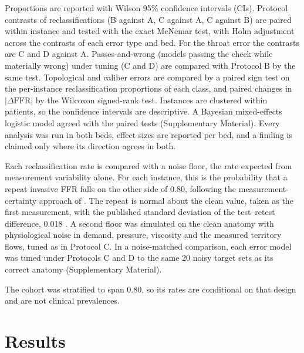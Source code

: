 \documentclass[journal,twoside,web]{ieeecolor}
\begin{document}
Proportions are reported with Wilson 95\% confidence intervals (CIs). Protocol contrasts of reclassifications (B against A, C against A, C against B) are paired within instance and tested with the exact McNemar test, with Holm adjustment across the contrasts of each error type and bed. For the throat error the contrasts are C and D against A. Passes-and-wrong (models passing the check while materially wrong) under tuning (C and D) are compared with Protocol B by the same test. Topological and caliber errors are compared by a paired sign test on
the per-instance reclassification proportions of each class, and paired changes in $|\Delta\mathrm{FFR}|$ by the Wilcoxon
signed-rank test. Instances are clustered within patients, so the confidence intervals are descriptive. A Bayesian mixed-effects logistic model agreed with the paired tests (Supplementary Material). Every analysis was run in both beds, effect sizes are reported per bed, and a finding is
claimed only where its direction agrees in both.

Each reclassification rate is compared with a noise floor, the rate expected from measurement variability alone. For each instance, this is the probability that a repeat invasive FFR falls on the other side of 0.80, following the measurement-certainty approach of \cite{petraco2013}. The repeat is normal about the clean value, taken as the first measurement, with the published standard deviation of the test--retest difference, 0.018 \cite{johnson2015}. A second floor was simulated on the clean anatomy with physiological
noise in demand, pressure, viscosity and the measured territory flows, tuned as in Protocol C. In a noise-matched comparison, each error model was tuned under Protocols C and D to the same 20 noisy target sets as its correct anatomy (Supplementary Material).

The cohort was stratified to span 0.80, so its rates are conditional on that design and are not clinical prevalences.

\section{Results}
\end{document}
